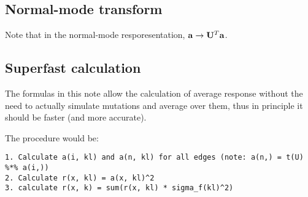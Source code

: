 \documentclass[
]{article}
\begin{document}
\hypertarget{normal-mode-transform}{%
\subsection{Normal-mode transform}\label{normal-mode-transform}}

Note that in the normal-mode resporesentation,
\(\mathbf{a} \rightarrow \mathbf{U}^T \mathbf{a}\).

\hypertarget{superfast-calculation}{%
\subsection{Superfast calculation}\label{superfast-calculation}}

The formulas in this note allow the calculation of average response
without the need to actually simulate mutations and average over them,
thus in principle it should be faster (and more accurate).

The procedure would be:

\begin{verbatim}
1. Calculate a(i, kl) and a(n, kl) for all edges (note: a(n,) = t(U) %*% a(i,))
2. Calculate r(x, kl) = a(x, kl)^2
3. calculate r(x, k) = sum(r(x, kl) * sigma_f(kl)^2)
\end{verbatim}
\end{document}
